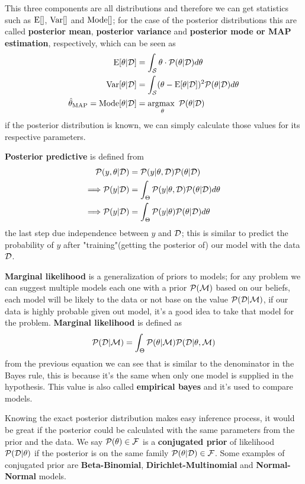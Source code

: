 \documentclass[../main.tex]{subfiles}
\begin{document}
This three components are all distributions and therefore we can get statistics such as $\mathrm{E}[]$, $\mathrm{Var}[]$ and $\mathrm{Mode}[]$; for the case of the posterior distributions this are called \textbf{posterior mean}, \textbf{posterior variance} and \textbf{posterior mode or MAP estimation}, respectively, which can be seen as
\begin{align*}
    \mathrm{E}[\theta|\mathcal{D}] &= \int_\mathcal{S} \theta \cdot \mathcal{P}(\theta|\mathcal{D})d\theta\\
    \mathrm{Var}[\theta|\mathcal{D}] &= \int_\mathcal{S} (\theta-\mathrm{E}[\theta|\mathcal{D}])^2 \mathcal{P}(\theta|\mathcal{D})d\theta\\
    \hat{\theta}_\mathrm{MAP} = \mathrm{Mode}[\theta|\mathcal{D}] &= \operatorname*{argmax\text{ }}_\theta \mathcal{P}(\theta|\mathcal{D})
\end{align*}
if the posterior distribution is known, we can simply calculate those values for its respective parameters.

\textbf{Posterior predictive} is defined from
\begin{align*}
    \mathcal{P}(y,\theta|\mathcal{D}) &= \mathcal{P}(y|\theta,\mathcal{D})\mathcal{P}(\theta|\mathcal{D})\\
    \Longrightarrow \mathcal{P}(y|\mathcal{D}) &= \int_\Theta \mathcal{P}(y|\theta,\mathcal{D})\mathcal{P}(\theta|\mathcal{D})d\theta\\
    \Longrightarrow \mathcal{P}(y|\mathcal{D}) &= \int_\Theta \mathcal{P}(y|\theta)\mathcal{P}(\theta|\mathcal{D})d\theta
\end{align*}
the last step due independence between $y$ and $\mathcal{D}$; this is similar to predict the probability of $y$ after "training"(getting the posterior of) our model with the data $\mathcal{D}$.

\textbf{Marginal likelihood} is a generalization of priors to models; for any problem we can suggest multiple models each one with a prior $\mathcal{P}(\mathcal{M})$ based on our beliefs, each model will be likely to the data or not base on the value $\mathcal{P}(\mathcal{D}|\mathcal{M})$, if our data is highly probable given out model, it's a good idea to take that model for the problem. \textbf{Marginal likelihood} is defined as
\begin{equation*}
    \mathcal{P}(\mathcal{D}|\mathcal{M}) = \int_\Theta \mathcal{P}(\theta|\mathcal{M})\mathcal{P}(\mathcal{D}|\theta,\mathcal{M})
\end{equation*}
from the previous equation we can see that is similar to the denominator in the Bayes rule, this is because it's the same when only one model is supplied in the hypothesis. This value is also called \textbf{empirical bayes} and it's used to compare models.

Knowing the exact posterior distribution makes easy inference process, it would be great if the posterior could be calculated with the same parameters from the prior and the data. We say $\mathcal{P}(\theta)\in\mathcal{F}$ is a \textbf{conjugated prior} of likelihood $\mathcal{P}(\mathcal{D}|\theta)$ if the posterior is on the same family $\mathcal{P}(\theta|\mathcal{D})\in\mathcal{F}$. Some examples of conjugated prior are \textbf{Beta-Binomial}, \textbf{Dirichlet-Multinomial} and \textbf{Normal-Normal} models.
\end{document}
